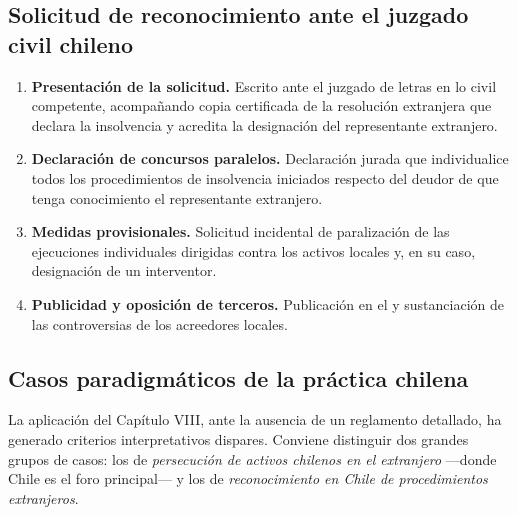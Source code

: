 \bloquePractico

\subsection{Solicitud de reconocimiento ante el juzgado civil chileno}

\begin{enumerate}
  \item \textbf{Presentación de la solicitud.} Escrito ante el juzgado de letras en lo
  civil competente, acompañando copia certificada de la resolución extranjera que declara
  la insolvencia y acredita la designación del representante extranjero.

  \item \textbf{Declaración de concursos paralelos.} Declaración jurada que individualice
  todos los procedimientos de insolvencia iniciados respecto del deudor de que tenga
  conocimiento el representante extranjero.

  \item \textbf{Medidas provisionales.} Solicitud incidental de paralización de las
  ejecuciones individuales dirigidas contra los activos locales y, en su caso,
  designación de un interventor.

  \item \textbf{Publicidad y oposición de terceros.} Publicación en el \boletin{} y
  sustanciación de las controversias de los acreedores locales.
\end{enumerate}

\subsection{Casos paradigmáticos de la práctica chilena}

La aplicación del Capítulo VIII, ante la ausencia de un reglamento detallado, ha generado
criterios interpretativos dispares. Conviene distinguir dos grandes grupos de casos: los de
\emph{persecución de activos chilenos en el extranjero} ---donde Chile es el foro principal---
y los de \emph{reconocimiento en Chile de procedimientos extranjeros}.


